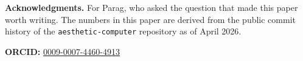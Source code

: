 \documentclass[10pt,letterpaper,twocolumn]{article}
\begin{document}
\vspace{0.5em}
\noindent\textbf{Acknowledgments.} For Parag, who asked the question that made this paper worth writing. The numbers in this paper are derived from the public commit history of the \texttt{aesthetic-computer} repository as of April 2026.

\vspace{0.5em}
\noindent\textbf{ORCID:} \href{https://orcid.org/0009-0007-4460-4913}{0009-0007-4460-4913}




\end{document}
